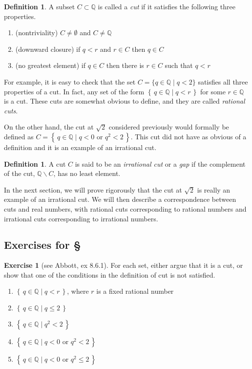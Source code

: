 \documentclass[11pt,oneside]{amsbook}
\newcommand{\set}[1]{\left\{\,#1\,\right\}}
\newcommand{\QQ}{\mathbb Q}
\renewcommand{\setminus}{\smallsetminus}
\theoremstyle{definition}
\newtheorem{exerc}{Exercise}[section]
\theoremstyle{plain}
\theoremstyle{definition}
\newtheorem{defn}[thm]{Definition}
\theoremstyle{remark}
\numberwithin{equation}{section}
\numberwithin{figure}{section}
\begin{document}
\begin{defn}
  A subset $C\subset\QQ$ is called a \emph{cut} if it satisfies the following three properties.
  \begin{enumerate}
  \item (nontriviality) $C\neq\emptyset$ and $C\neq\QQ$
  \item (downward closure) if $q<r$ and $r\in C$ then $q\in C$
  \item (no greatest element) if $q\in C$ then there is $r\in C$ such that $q<r$
  \end{enumerate}
\end{defn}

For example, it is easy to check that the set $C=\{q\in\QQ\mid q<2\}$ satisfies all three properties of a cut. In fact, any set of the form $\set{q\in\QQ\mid q<r}$ for some $r\in\QQ$ is a cut. These cuts are somewhat obvious to define, and they are called \emph{rational cuts}.

On the other hand, the cut at $\sqrt{2}$ considered previously would formally be defined as $C=\set{q\in\QQ\mid q<0\text{ or }q^2<2}$. This cut did not have as obvious of a definition and it is an example of an irrational cut.

\begin{defn}
  A cut $C$ is said to be an \emph{irrational cut} or a \emph{gap} if the complement of the cut, $\QQ\setminus C$, has no least element.
\end{defn}

In the next section, we will prove rigorously that the cut at $\sqrt{2}$ is really an example of an irrational cut. We will then describe a correspondence between cuts and real numbers, with rational cuts corresponding to rational numbers and irrational cuts corresponding to irrational numbers.

\newpage
\subsection*{Exercises for \S \thesection}

\begin{exerc}[see Abbott, ex 8.6.1]
  For each set, either argue that it is a cut, or show that one of the conditions in the definition of cut is not satisfied.
  \begin{enumerate}
  \item $\set{q\in\QQ\mid q<r}$, where $r$ is a fixed rational number
  \item $\set{q\in\QQ\mid q\leq2}$
  \item $\set{q\in\QQ\mid q^2<2}$
  \item $\set{q\in\QQ\mid q<0\text{ or }q^2<2}$
  \item $\set{q\in\QQ\mid q<0\text{ or }q^2\leq2}$
  \end{enumerate}
\end{exerc}
\end{document}

